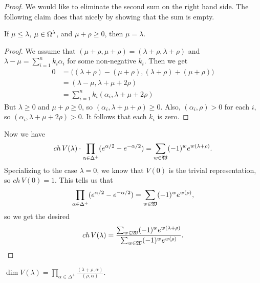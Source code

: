 \begin{proof}
  We would like to eliminate the second sum on the right hand side. The following
  claim does that nicely by showing that the sum is empty.
  \begin{claim}
    If  $\mu\le \lambda$, $\mu\in \Omega^\lambda$, and $\mu+\rho \ge 0$, then $\mu=\lambda$.
  \end{claim}
  \begin{proof}
  We assume that $(\mu+\rho,\mu+\rho)=(\lambda+\rho,\lambda+\rho)$ and $\lambda-\mu =
  \sum_{i=1}^n k_i \alpha_i$ for some non-negative $k_i$. Then we get
  \begin{align*}
    0 &= \big( (\lambda+\rho)-(\mu+\rho),(\lambda+\rho)+(\mu+\rho) \big)\\
      &= (\lambda-\mu, \lambda+\mu+2\rho)\\
      &= \sum_{i=1}^n k_i (\alpha_i, \lambda+\mu+2\rho)
  \end{align*}
  But $\lambda\ge 0$ and $\mu+\rho\ge 0$, so $(\alpha_i,\lambda+\mu+\rho)\ge 0$. Also,
  $(\alpha_i,\rho)>0$ for each $i$, so $(\alpha_i, \lambda+\mu+2\rho)>0$. It follows
  that each $k_i$ is zero.
  \renewcommand{\qedsymbol}{$\Box_\text{Claim}$\quad}
  \end{proof}

  Now we have
  \[
    ch\, V(\lambda) \cdot \prod_{\alpha\in \Delta^+}(e^{\alpha/2}-e^{-\alpha/2}) =
    \sum_{w\in \mathfrak{W}}(-1)^w e^{w(\lambda+\rho)}.
  \]
  Specializing to the case $\lambda=0$, we know that $V(0)$ is the trivial
  representation, so $ch\, V(0)=1$. This tells us that
  \begin{equation}
    \prod_{\alpha\in \Delta^+}(e^{\alpha/2}-e^{-\alpha/2}) = \sum_{w\in \mathfrak{W}}(-1)^w
    e^{w(\rho)}, \label{lec19WeylD}
  \end{equation}
  so we get the desired
  \[
    ch\, V(\lambda) =\frac{\sum_{w\in \mathfrak{W}}(-1)^w e^{w(\lambda+\rho)}}{\sum_{w\in
    \mathfrak{W}}(-1)^w e^{w(\rho)}}. \qedhere
  \]
  \end{proof}
 \begin{corollary}
   $\displaystyle \dim V(\lambda) = \prod_{\alpha\in \Delta^+} \frac{(\lambda+\rho,
    \alpha)}{(\rho,\alpha)}$.
 \end{corollary}
